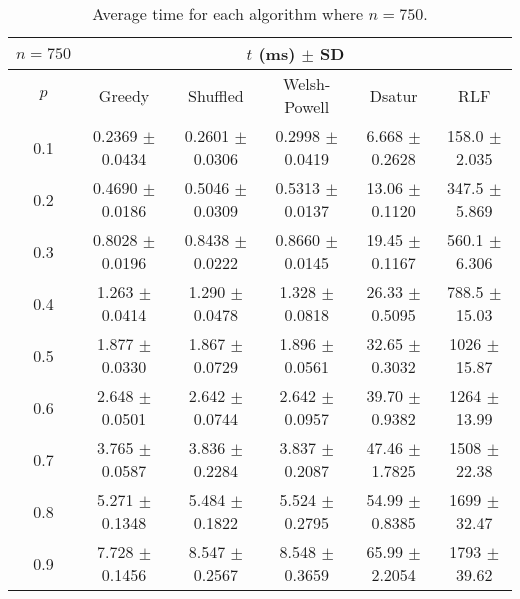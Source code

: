 \begin{table}[H]
    \centering
    \begin{tabular}{cccccc}
        
        $n = 750$& \multicolumn{5}{c}{$t$ (\unit{ms}) $\pm$ SD} \\
        \hline
        $p$ & Greedy & Shuffled & Welsh-Powell & Dsatur & RLF \\
        \hline
         0.1 & 0.2369 $\pm$ 0.0434 & 0.2601 $\pm$ 0.0306 & 0.2998 $\pm$ 0.0419 & 6.668 $\pm$ 0.2628 & 158.0 $\pm$ 2.035 \\
        0.2 & 0.4690 $\pm$ 0.0186 & 0.5046 $\pm$ 0.0309 & 0.5313 $\pm$ 0.0137 & 13.06 $\pm$ 0.1120 & 347.5 $\pm$ 5.869 \\
        0.3 & 0.8028 $\pm$ 0.0196 & 0.8438 $\pm$ 0.0222 & 0.8660 $\pm$ 0.0145 & 19.45 $\pm$ 0.1167 & 560.1 $\pm$ 6.306 \\
        0.4 & 1.263 $\pm$ 0.0414 & 1.290 $\pm$ 0.0478 & 1.328 $\pm$ 0.0818 & 26.33 $\pm$ 0.5095 & 788.5 $\pm$ 15.03 \\
        0.5 & 1.877 $\pm$ 0.0330 & 1.867 $\pm$ 0.0729 & 1.896 $\pm$ 0.0561 & 32.65 $\pm$ 0.3032 & 1026 $\pm$ 15.87 \\
        0.6 & 2.648 $\pm$ 0.0501 & 2.642 $\pm$ 0.0744 & 2.642 $\pm$ 0.0957 & 39.70 $\pm$ 0.9382 & 1264 $\pm$ 13.99 \\
        0.7 & 3.765 $\pm$ 0.0587 & 3.836 $\pm$ 0.2284 & 3.837 $\pm$ 0.2087 & 47.46 $\pm$ 1.7825 & 1508 $\pm$ 22.38 \\
        0.8 & 5.271 $\pm$ 0.1348 & 5.484 $\pm$ 0.1822 & 5.524 $\pm$ 0.2795 & 54.99 $\pm$ 0.8385 & 1699 $\pm$ 32.47 \\
        0.9 & 7.728 $\pm$ 0.1456 & 8.547 $\pm$ 0.2567 & 8.548 $\pm$ 0.3659 & 65.99 $\pm$ 2.2054 & 1793 $\pm$ 39.62 \\
   
        \hline
    \end{tabular}
    \caption{Average time for each algorithm where $n = 750$.}
    \label{tab:avgTimeforV750}
\end{table}

